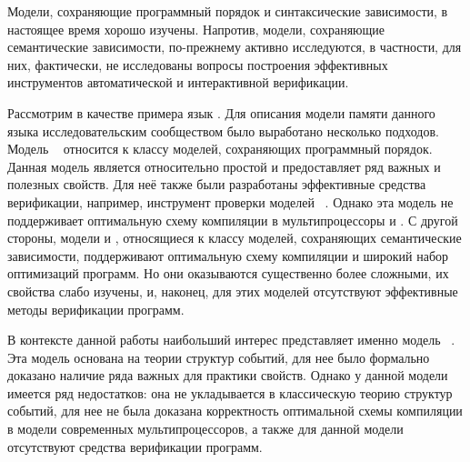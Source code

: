 Модели, сохраняющие программный порядок и синтаксические зависимости, 
в настоящее время хорошо изучены. Напротив, модели, 
сохраняющие семантические зависимости, по-прежнему активно исследуются,
в частности, для них, фактически, не исследованы
вопросы построения эффективных инструментов автоматической и интерактивной верификации. 


Рассмотрим в качестве примера язык \CPP.
Для описания модели памяти данного языка исследовательским
сообществом было выработано несколько подходов.
Модель \RCMM~\autocite{Lahav-al:PLDI17}
относится к классу моделей, сохраняющих программный порядок.
Данная модель является относительно простой и
предоставляет ряд важных и полезных свойств.
Для неё также были разработаны эффективные
средства верификации,
например, инструмент проверки моделей \genmc~\autocite{Kokologiannakis:PLDI2019}.
Однако эта модель не поддерживает
оптимальную схему компиляции в  мультипроцессоры \ARM и \POWER.
С другой стороны, модели \Prm и \Wkm,
относящиеся к классу моделей, сохраняющих семантические зависимости,
поддерживают оптимальную схему компиляции и широкий набор оптимизаций программ.
Но они оказываются существенно более сложными, их свойства слабо изучены,  и, наконец, для этих моделей
отсутствуют эффективные методы верификации программ. 

В контексте данной работы наибольший интерес
представляет именно модель \Wkm~\autocite{Chakraborty-Vafeiadis:POPL19}. Эта
модель основана на теории структур событий,
 для нее было формально доказано наличие ряда важных для практики свойств.
Однако у данной модели имеется ряд недостатков:
она  не укладывается в классическую теорию структур событий,
для нее не была доказана корректность оптимальной схемы
компиляции в модели современных мультипроцессоров,
а также для данной модели отсутствуют
средства верификации программ.


